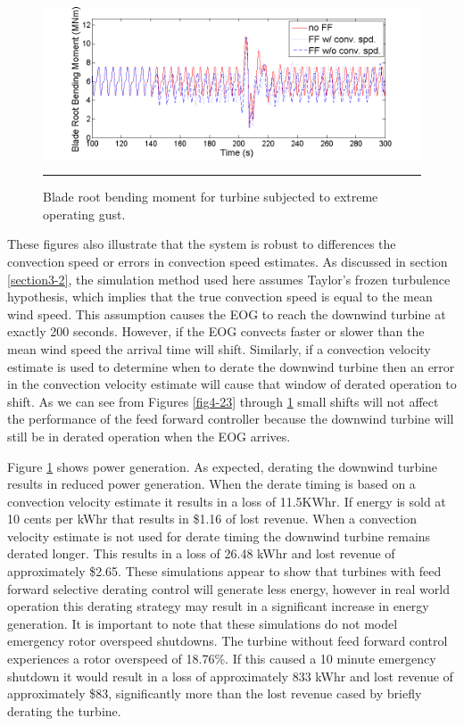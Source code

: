 \begin{figure}[htbp]
	\centering
		\includegraphics[trim = {1cm 0 2cm 0}, clip, width = \linewidth]{Figures/ch4Figures/fig4-25.png}
		\rule{35em}{0.5pt}
	\caption{Blade root bending moment for turbine subjected to extreme operating gust.}
	\label{fig4-25}
\end{figure}



These figures also illustrate that the system is robust to differences the convection speed or errors in convection speed estimates. As discussed in section \ref{section3-2}, the simulation method used here assumes Taylor's frozen turbulence hypothesis, which implies that the true convection speed is equal to the mean wind speed. This assumption causes the EOG to reach the downwind turbine at exactly 200 seconds. However, if the EOG convects faster or slower than the mean wind speed the arrival time will shift. Similarly, if a convection velocity estimate is used to determine when to derate the downwind turbine then an error in the convection velocity estimate will cause that window of derated operation to shift. As we can see from Figures \ref{fig4-23} through \ref{fig4-25} small shifts will not affect the performance of the feed forward controller because the downwind turbine will still be in derated operation when the EOG arrives.

Figure \ref{fig4-25} shows power generation. As expected, derating the downwind turbine results in reduced power generation. When the derate timing is based on a convection velocity estimate it results in a loss of 11.5KWhr. If energy is sold at 10 cents per kWhr that results in \$1.16 of lost revenue. When a convection velocity estimate is not used for derate timing the downwind turbine remains derated longer. This results in a loss of 26.48 kWhr and lost revenue of approximately \$2.65. These simulations appear to show that turbines with feed forward selective derating control will generate less energy, however in real world operation this derating strategy may result in a significant increase in energy generation. It is important to note that these simulations do not model emergency rotor overspeed shutdowns. The turbine without feed forward control experiences a rotor overspeed of 18.76\%. If this caused a 10 minute emergency shutdown it would result in a loss of approximately 833 kWhr and lost revenue of approximately \$83, significantly more than the lost revenue cased by briefly derating the turbine.

